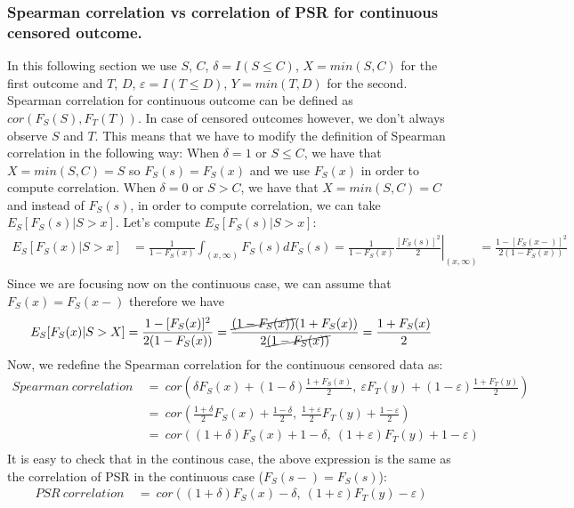 \documentclass[]{article}
\let\epsilon\varepsilon
\begin{document}
\subsubsection{Spearman correlation vs correlation of PSR for continuous censored outcome.}
In this following section we use $S$, $C$, $\delta=I(S\leq C)$, $X = min(S, C)$ for the first outcome and $T$, $D$, $\epsilon=I(T\leq D)$, $Y = min(T, D)$ for the second.\\
Spearman correlation for continuous outcome can be defined as $cor(F_S(S), F_T(T))$. In case of censored outcomes however, we don't always observe $S$ and $T$. This means that we have to modify the definition of Spearman correlation in the following way: When $\delta = 1$ or $S\leq C$, we have that $X = min(S, C)=S$ so $F_S(s)=F_S(x)$ and we use $F_S(x)$ in order to compute correlation. When $\delta = 0$ or $S > C$, we have that $X = min(S, C)=C$ and instead of $F_S(s)$, in order to compute correlation, we can take $E_S[F_S(s)|S>x]$. Let's compute $E_S[F_S(s)|S>x]$:
	$$
	\begin{aligned}
		E_S[F_S(x)|S>x] &= \frac{1}{1-F_S(x)}\int_{(x, \infty)} F_S(s)dF_S(s) = \frac{1}{1-F_S(x)} \left.\frac{ [F_S(s)]^2}{2}\right|_{(x, \infty)} = \frac{1-[F_S(x-)]^2}{2(1-F_S(x))} \\
	\end{aligned}
	$$
Since we are focusing now on the continuous case, we can assume that $F_S(x)=F_S(x-)$ therefore we have
	$$
	\begin{aligned}
		E_S[F_S(x)|S>X] &=\frac{1-[F_S(x)]^2}{2(1-F_S(x))}=\frac{\cancel{(1-F_S(x))}(1+F_S(x))}{2\cancel{(1-F_S(x))}}  = \frac{1+F_S(x)}{2} \\
	\end{aligned}
	$$
Now, we redefine the Spearman correlation for the continuous censored data as:
	$$
	\begin{aligned}
		Spearman~correlation~&=~ cor\left(  \delta F_S(x) + (1-\delta) \frac{1+F_S(x)}{2},~\epsilon F_T(y) + (1-\epsilon) \frac{1+F_T(y)}{2}  \right)\\
		&=~ cor\left(  \frac{1+\delta}{2}F_S(x) +  \frac{1-\delta}{2},~\frac{1+\epsilon}{2}F_T(y) +  \frac{1-\epsilon}{2}  \right)\\
		&=~ cor\left(  (1+\delta)F_S(x) +  1-\delta,~(1+\epsilon)F_T(y) +  1-\epsilon  \right)\\
	\end{aligned}
	$$
It is easy to check that in the continous case, the above expression is the same as the correlation of PSR in the continuous case ($F_S(s-) = F_S(s)$): 
	$$
	\begin{aligned}
		PSR~correlation~&=~ cor\left(  (1+\delta)F_S(x) -\delta,~(1+\epsilon)F_T(y) -\epsilon  \right)\\
	\end{aligned}
	$$
\end{document}
